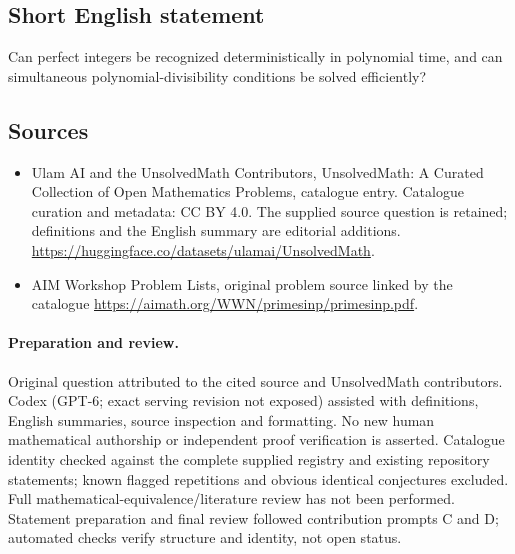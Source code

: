 \documentclass[11pt]{article}
\begin{document}
\subsection{Short English statement}
Can perfect integers be recognized deterministically in polynomial time, and can simultaneous polynomial-divisibility conditions be solved efficiently?
\subsection{Sources}
\begin{itemize}
\item[\hypertarget{source:statement:1}{S1}] Ulam AI and the UnsolvedMath Contributors, UnsolvedMath: A Curated Collection of Open Mathematics Problems, catalogue entry. Catalogue curation and metadata: CC BY 4.0. The supplied source question is retained; definitions and the English summary are editorial additions.
\url{https://huggingface.co/datasets/ulamai/UnsolvedMath}.
\item[\hypertarget{source:statement:2}{S2}] AIM Workshop Problem Lists, original problem source linked by the catalogue
\url{https://aimath.org/WWN/primesinp/primesinp.pdf}.
\end{itemize}
\paragraph{Preparation and review.}
Original question attributed to the cited source and UnsolvedMath contributors. Codex (GPT-6; exact serving revision not exposed) assisted with definitions, English summaries, source inspection and formatting. No new human mathematical authorship or independent proof verification is asserted. Catalogue identity checked against the complete supplied registry and existing repository statements; known flagged repetitions and obvious identical conjectures excluded. Full mathematical-equivalence/literature review has not been performed. Statement preparation and final review followed contribution prompts C and D; automated checks verify structure and identity, not open status.
\label{end:statement}
\end{document}
